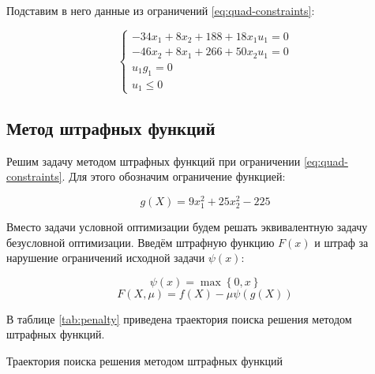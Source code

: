 Подставим в него данные из ограничений \ref{eq:quad-constraints}:

\begin{equation*}
\begin{cases}
	-34 x_1 + 8 x_2 + 188 + 18 x_1 u_1 = 0
	\\
	-46 x_2 + 8 x_1 + 266 + 50 x_2 u_1 = 0
	\\
	u_1 g_1 = 0
	\\
	u_1 \leq 0
\end{cases}
\end{equation*}

\subsection{Метод штрафных функций}

Решим задачу методом штрафных функций при ограничении \ref{eq:quad-constraints}. Для этого обозначим ограничение функцией:

\begin{equation*}
	g(X) = 9 x_1^2 + 25 x_2^2 - 225
\end{equation*}

Вместо задачи условной оптимизации будем решать эквивалентную задачу безусловной оптимизации. Введём штрафную функцию $F(x)$ и штраф за нарушение ограничений исходной задачи $\psi(x)$:

\begin{equation*}
\psi(x) = \max \left\{ 0, x \right\}
\end{equation*}
\begin{equation*}
F(X, \mu) = f(X) - \mu \psi(g(X))
\end{equation*}

В таблице \ref{tab:penalty} приведена траектория поиска решения методом штрафных функций.

\begin{table}[H]
\begin{center}
	\caption{Траектория поиска решения методом штрафных функций}
	\label{tab:penalty}
	\def\tabcolsep{18pt}
	\def\arraystretch{1.5}
	\fontsize{13}{14}\selectfont
\end{center}
\end{table}

